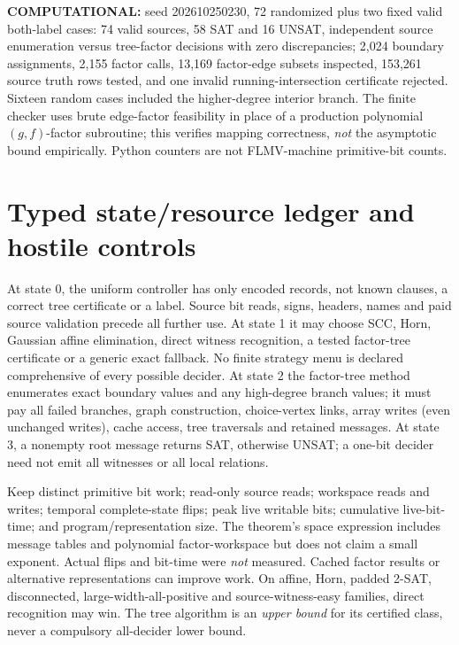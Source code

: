 \documentclass[11pt]{article}
\begin{document}
\textbf{COMPUTATIONAL:} seed 202610250230, 72 randomized plus two
fixed valid both-label cases: 74 valid sources, 58 SAT and 16 UNSAT,
independent source enumeration versus tree-factor decisions with
zero discrepancies; 2,024 boundary assignments, 2,155 factor calls,
13,169 factor-edge subsets inspected, 153,261 source truth rows
tested, and one invalid running-intersection certificate rejected.
Sixteen random cases included the higher-degree interior branch.
The finite checker uses brute edge-factor feasibility in place of
a production polynomial $(g,f)$-factor subroutine; this verifies
mapping correctness, \emph{not} the asymptotic bound empirically.
Python counters are not FLMV-machine primitive-bit counts.

\section{Typed state/resource ledger and hostile controls}
At state 0, the uniform controller has only encoded records, not
known clauses, a correct tree certificate or a label. Source bit
reads, signs, headers, names and paid source validation precede
all further use. At state 1 it may choose SCC, Horn, Gaussian
affine elimination, direct witness recognition, a tested factor-tree
certificate or a generic exact fallback. No finite strategy menu
is declared comprehensive of every possible decider. At state 2
the factor-tree method enumerates exact boundary values and any
high-degree branch values; it must pay all failed branches, graph
construction, choice-vertex links, array writes (even unchanged
writes), cache access, tree traversals and retained messages.
At state 3, a nonempty root message returns SAT, otherwise UNSAT;
a one-bit decider need not emit all witnesses or all local relations.

Keep distinct primitive bit work; read-only source reads; workspace
reads and writes; temporal complete-state flips; peak live writable
bits; cumulative live-bit-time; and program/representation size.
The theorem's space expression includes message tables and polynomial
factor-workspace but does not claim a small exponent. Actual flips
and bit-time were \emph{not} measured. Cached factor results or
alternative representations can improve work. On affine,
Horn, padded 2-SAT, disconnected, large-width-all-positive and
source-witness-easy families, direct recognition may win. The
tree algorithm is an \emph{upper bound} for its certified class,
never a compulsory all-decider lower bound.
\end{document}
